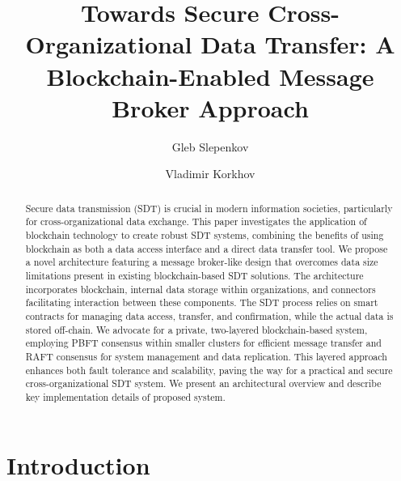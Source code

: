 \documentclass[10pt]{llncs}
\begin{document}
\title{Towards Secure Cross-Organizational Data Transfer: A Blockchain-Enabled Message Broker Approach}
\author{Gleb Slepenkov\and Vladimir Korkhov}

\maketitle

\begin{abstract}
    Secure data transmission (SDT) is crucial in modern information societies, particularly for cross-organizational data exchange. 
    This paper investigates the application of blockchain technology to create robust SDT systems, combining the benefits of using blockchain as both a data access interface and a direct data transfer tool. 
    We propose a novel architecture featuring a message broker-like design that overcomes data size limitations present in existing blockchain-based SDT solutions. 
    The architecture incorporates blockchain, internal data storage within organizations, and connectors facilitating interaction between these components. 
    The SDT process relies on smart contracts for managing data access, transfer, and confirmation, while the actual data is stored off-chain. 
    We advocate for a private, two-layered blockchain-based system, employing PBFT consensus within smaller clusters for efficient message transfer and RAFT consensus for system management and data replication. 
    This layered approach enhances both fault tolerance and scalability, paving the way for a practical and secure cross-organizational SDT system.
    We present an architectural overview and describe key implementation details of proposed system.
    
\end{abstract}

\section{Introduction}
\end{document}
